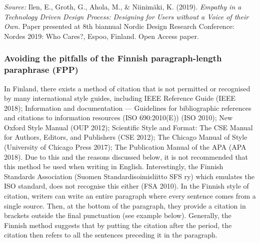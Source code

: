 \documentclass[english, 12pt, a4paper, elec, utf8, a-2b, online]{aaltothesis}
\begin{document}
\vspace{1ex}
\noindent
{}

\vspace{1ex}
\noindent
\textit{Source:} Ilen, E., Groth, G., Ahola, M., \& Niinimäki, K. (2019). 
\textit{Empathy in a Technology Driven Design Process: Designing for Users 
	without a Voice of their Own.} Paper presented at 8th biannual Nordic Design
	Research Conference: Nordes 2019: Who Cares?, Espoo, Finland. Open Access 
	paper.


\subsubsection*{Avoiding the pitfalls of the Finnish paragraph-length paraphrase
	 (FPP)}

In Finland, there exists a method of citation that is not permitted or 
recognised by many international style guides, including IEEE Reference Guide 
(IEEE 2018); Information and documentation --- Guidelines for bibliographic 
references and citations to information resources (ISO 690:2010(E)) (ISO 2010); 
New Oxford Style Manual (OUP 2012); Scientific Style and Format: The CSE Manual 
for Authors, Editors, and Publishers (CSE 2012); The Chicago Manual of Style 
(University of Chicago Press 2017); The Publication Manual of the APA (APA 
2018). Due to this and the reasons discussed below, it is not recommended that 
this method be used when writing in English. Interestingly, the Finnish 
Standards Association (Suomen Standardisoimisliitto SFS ry) which emulates the 
ISO standard, does not recognise this either (FSA 2010). In the Finnish style of
citation, writers can write an entire paragraph where every sentence comes from 
a single source. Then, at the bottom of the paragraph, they provide a citation 
in brackets outside the final punctuation (see example below). Generally, the 
Finnish method suggests that by putting the citation after the period, the 
citation then refers to all the sentences preceding it in the paragraph.
\end{document}
